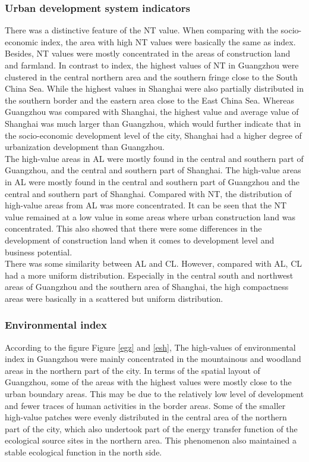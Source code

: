 \subsubsection{Urban development system indicators}
There was a distinctive feature of the NT value. When comparing with the socio-economic index, the area with high NT values were basically the same as index. Besides, NT values were mostly concentrated in the areas of construction land and farmland. In contrast to index, the highest values of NT in Guangzhou were clustered in the central northern area and the southern fringe close to the South China Sea. While the highest values in Shanghai were also partially distributed in the southern border and the eastern area close to the East China Sea. Whereas Guangzhou was compared with Shanghai, the highest value and average value of Shanghai was much larger than Guangzhou, which would further indicate that in the socio-economic development level of the city, Shanghai had a higher degree of urbanization development than Guangzhou.\\

The high-value areas in AL were mostly found in the central and southern part of Guangzhou, and the central and southern part of Shanghai. The high-value areas in AL were mostly found in the central and southern part of Guangzhou and the central and southern part of Shanghai. Compared with NT, the distribution of high-value areas from AL was more concentrated. It can be seen that the NT value remained at a low value in some areas where urban construction land was concentrated. This also showed that there were some differences in the development of construction land when it comes to development level and business potential.\\

There was some similarity between AL and CL. However, compared with AL, CL had a more uniform distribution. Especially in the central south and northwest areas of Guangzhou and the southern area of Shanghai, the high compactness areas were basically in a scattered but uniform distribution.\\



\subsubsection{Environmental index}
According to the figure Figure \ref{egz} and \ref{esh}, The high-values of environmental index in Guangzhou were mainly concentrated in the mountainous and woodland areas in the northern part of the city. In terms of the spatial layout of Guangzhou, some of the areas with the highest values were mostly close to the urban boundary areas. This may be due to the relatively low level of development and fewer traces of human activities in the border areas. Some of the smaller high-value patches were evenly distributed in the central area of the northern part of the city, which also undertook part of the energy transfer function of the ecological source sites in the northern area. This phenomenon also maintained a stable ecological function in the north side.\\

